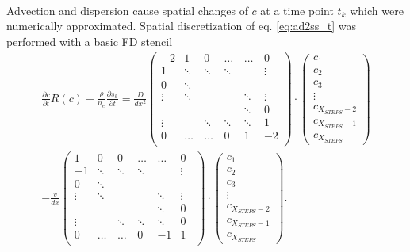 \\
Advection and dispersion cause spatial changes of $c$ at a time point $t_k$ which were numerically approximated. Spatial discretization of eq. \ref{eq:ad2ss_t} was performed with a basic FD stencil
\begin{align}
    \frac{\partial c}{\partial t} R(c) + \frac{\rho}{n_e}\frac{\partial s_k}{\partial t} = \frac{D}{dx^2} \begin{pmatrix} 
    -2 & 1 & 0 & \dots & \hdots & 0\\
    1 & \ddots & \ddots & \ddots & \quad & \vdots\\
    0 & \ddots & \quad & \quad &\quad & \quad\\
    \vdots & \ddots & \quad &\quad&\ddots&\vdots\\
    \quad&\quad&\quad&\quad&\ddots&0\\
    \vdots&\quad&\ddots&\ddots&\ddots&1\\
    0&\hdots&\dots&0&1&-2\\
    \end{pmatrix}
    \cdot
    \begin{pmatrix}
    c_1\\
    c_2\\
    c_3\\
    \vdots\\
    c_{X_{STEPS}-2}\\
    c_{X_{STEPS}-1}\\
    c_{X_{STEPS}}
    \end{pmatrix}
    \nonumber\\
    -\frac{v}{dx}
    \begin{pmatrix} 
    1 & 0 & 0 & \dots & \hdots & 0\\
    -1 & \ddots & \ddots & \ddots & \quad & \vdots\\
    0 & \ddots & \quad & \quad &\quad & \quad\\
    \vdots & \ddots & \quad &\quad&\ddots&\vdots\\
    \quad&\quad&\quad&\quad&\ddots&0\\
    \vdots&\quad&\ddots&\ddots&\ddots&0\\
    0&\hdots&\dots&0&-1&1\\
    \end{pmatrix}
        \cdot
    \begin{pmatrix}
    c_1\\
    c_2\\
    c_3\\
    \vdots\\
    c_{X_{STEPS}-2}\\
    c_{X_{STEPS}-1}\\
    c_{X_{STEPS}}
    \end{pmatrix}.
    \label{eq:basic_FD}
\end{align}
